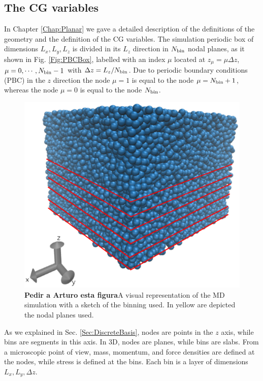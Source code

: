 \documentclass[b5paper,openright,10pt]{book}
\newcommand{\Note}[1]{{\bf \color{red}#1}}    %
\begin{document}
\subsection{The CG variables}
\label{Sec:CGVariablesPBC}
In Chapter \ref{Chap:Planar} we gave a detailed description of the definitions of the geometry and the definition of the CG variables.
The simulation periodic box of  dimensions $L_x,L_y,L_z$ is divided in
its $L_z$  direction in  $N_{\rm bin}$ nodal  planes, as it shown in Fig. \ref{Fig:PBCBox}, labelled
with   an    index   $\mu$   located   at    $z_\mu=\mu   \Delta   z$,
$\mu=0,\cdots,N_{\rm bin}-1$ with $\Delta  z=L_z/N_{\rm bin}$.  Due to
periodic  boundary conditions  (PBC)  in the  $z$  direction the  node
$\mu=1$ is equal to the node  $\mu=N_{\rm bin}+1$, whereas the node $\mu=0$
is equal to the node  $N_{\rm bin}$.  

\begin{figure}
    \centering
    \includegraphics[scale=0.3]{system_nodes_periodic}
    \caption[Visual representation of an unconfined fluid simulation and the binning used]{\Note{Pedir a Arturo esta figura}A visual representation of the MD simulation with a sketch of the binning used. In yellow are depicted the nodal planes used.}
    \label{fig:PBCBox}
\end{figure}
As we explained in Sec. \ref{Sec:DiscreteBasis}, nodes are  points  in  the $z$  axis,  while bins  are
segments in this axis.  In 3D, nodes are planes, while bins are slabs.
From  a microscopic point of  view, mass,
momentum, and force  densities are defined at the  nodes, while stress
is  defined  at  the  bins.   Each   bin  is  a  layer  of  dimensions
$L_x,L_y,\Delta z$. 
\end{document}
